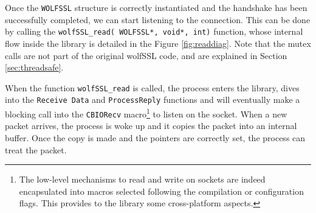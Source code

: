 Once the \texttt{WOLFSSL} structure is correctly instantiated and the handshake has been successfully completed, we can start listening to the connection. This can be done by calling the \texttt{wolfSSL\_read( WOLFSSL*, void*, int)} function, whose internal flow inside the library is detailed in the Figure \ref{fig:readdiag}. Note that the mutex calls are not part of the original wolfSSL code, and are explained in Section \ref{sec:threadsafe}.

When the function \texttt{wolfSSL\_read} is called, the process enters the library, dives into the \texttt{Receive Data} and \texttt{ProcessReply} functions and will eventually make a blocking call into the \texttt{CBIORecv} macro\footnote{The low-level mechanisms to read and write on sockets are indeed encapsulated into macros selected following the compilation or configuration flags. This provides to the library some cross-platform aspects.} to listen on the socket. When a new packet arrives, the process is woke up and it copies the packet into an internal buffer. Once the copy is made and the pointers are correctly set, the process can treat the packet.

